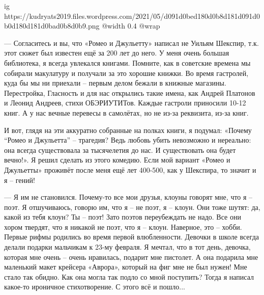 \ifcmt
  ig https://kudryats2019.files.wordpress.com/2021/05/d091d0bed180d0b8d181d091d0b0d180d181d0bad0b8d0b9.png
  @width 0.4
  @wrap 
\fi


— Согласитесь и вы, что «Ромео и Джульетту» написал не Уильям Шекспир, т.к.
этот сюжет был известен ещё за 200 лет до него. У меня очень большая
библиотека, я всегда увлекался книгами. Помните, как в советские времена мы
собирали макулатуру и получали за это хорошие книжки. Во время гастролей, куда
бы мы ни приехали – первым делом бежали в книжные магазины. Перестройка,
Гласность и для нас открылись такие имена, как Андрей Платонов и Леонид
Андреев, стихи ОБЭРИУТИТов. Каждые гастроли приносили 10-12 книг. А у нас
вечные перевесы в самолётах, но не из-за реквизита, из-за книг.

И вот, глядя на эти аккуратно собранные на полках книги, я подумал: «Почему
\enquote{Ромео и Джульетта} – трагедия? Ведь любовь убить невозможно и нереально: она
всегда существовала за тысячелетия до нас. И существовать она будет вечно!». Я
решил сделать из этого комедию. Если мой вариант «Ромео и Джульетты» проживёт
после меня ещё лет 400-500, как у Шекспира, то значит и я – гений!


— Я им не становился. Почему-то все мои друзья, клоуны говорят мне, что я –
поэт. Я отшучиваюсь, говорю им, что я – не поэт, я – клоун. Они тоже шутят: да,
какой из тебя клоун? Ты –  поэт! Зато поэтов переубеждать не надо. Все они
хором твердят, что я никакой не поэт, что я –  клоун. Наверное, это – хобби.
Первые рифмы родились во время первой влюбленности. Девочки в школе всегда
делали подарки мальчикам к 23-му февраля. Я мечтал, что в тот день, девочка,
которая мне очень – очень нравилась, подарит мне пистолет. А она подарила мне
маленький макет крейсера «Аврора», который на фиг мне не был нужен! Мне стало
так обидно. Как она могла так подло со мной поступить? Тогда я написал какое-то
ироничное стихотворение. С этого всё и пошло...


